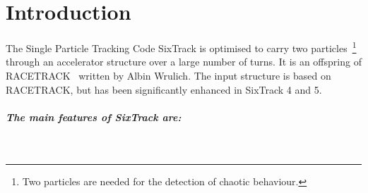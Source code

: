 
\chapter{Introduction} \label{Intro}

The Single Particle Tracking Code SixTrack is optimised to carry two particles~\footnote{Two particles are needed for the detection of chaotic behaviour.} through an accelerator structure over a large number of turns.
It is an offspring of RACETRACK~\cite{RACETRACK} written by Albin Wrulich.
The input structure is based on RACETRACK, but has been significantly enhanced in SixTrack 4 and 5.

\paragraph{The main features of SixTrack are:}~
